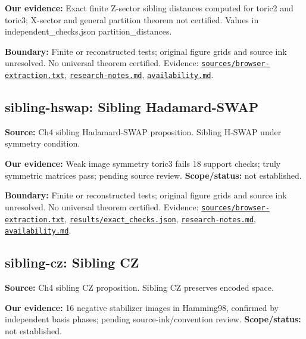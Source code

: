 \documentclass[11pt]{article}
\begin{document}
\textbf{Our evidence:} Exact finite Z-sector sibling distances computed for toric2 and toric3; X-sector and general partition theorem not certified. Values in independent\_checks.json partition\_distances.

\textbf{Boundary:} Finite or reconstructed tests; original figure grids and source ink unresolved. No universal theorem certified. Evidence: \href{https://github.com/alectionary/vibe-math/blob/master/formalization/quintavalle-hgp/sources/browser-extraction.txt}{\nolinkurl{sources/browser-extraction.txt}}, \href{https://github.com/alectionary/vibe-math/blob/master/formalization/quintavalle-hgp/research-notes.md}{\nolinkurl{research-notes.md}}, \href{https://github.com/alectionary/vibe-math/blob/master/formalization/quintavalle-hgp/availability.md}{\nolinkurl{availability.md}}.
\subsection{sibling-hswap: Sibling Hadamard-SWAP}
\label{claim:sibling-hswap}
\textbf{Source:} Ch4 sibling Hadamard-SWAP proposition. Sibling H-SWAP under symmetry condition.

\textbf{Our evidence:} Weak image symmetry toric3 fails 18 support checks; truly symmetric matrices pass; pending source review. \textbf{Scope/status:} not established.

\textbf{Boundary:} Finite or reconstructed tests; original figure grids and source ink unresolved. No universal theorem certified. Evidence: \href{https://github.com/alectionary/vibe-math/blob/master/formalization/quintavalle-hgp/sources/browser-extraction.txt}{\nolinkurl{sources/browser-extraction.txt}}, \href{https://github.com/alectionary/vibe-math/blob/master/formalization/quintavalle-hgp/results/exact_checks.json}{\nolinkurl{results/exact_checks.json}}, \href{https://github.com/alectionary/vibe-math/blob/master/formalization/quintavalle-hgp/research-notes.md}{\nolinkurl{research-notes.md}}, \href{https://github.com/alectionary/vibe-math/blob/master/formalization/quintavalle-hgp/availability.md}{\nolinkurl{availability.md}}.
\subsection{sibling-cz: Sibling CZ}
\label{claim:sibling-cz}
\textbf{Source:} Ch4 sibling CZ proposition. Sibling CZ preserves encoded space.

\textbf{Our evidence:} 16 negative stabilizer images in Hamming98, confirmed by independent basis phases; pending source-ink/convention review. \textbf{Scope/status:} not established.
\end{document}
